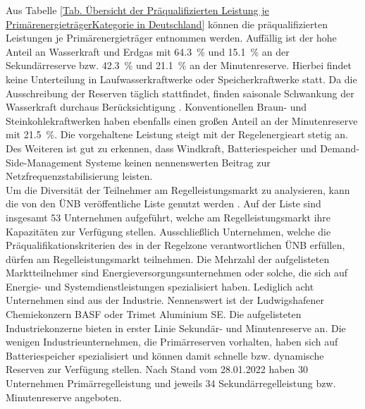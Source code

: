 			Aus Tabelle \ref{Tab. Übersicht der Präqualifizierten Leistung je PrimärenergieträgerKategorie in Deutschland} können die präqualifizierten Leistungen je Primärenergieträger entnommen werden.
			Auffällig ist der hohe Anteil an Wasserkraft und Erdgas mit \SI{64,3}{\percent} und \SI{15,1}{\percent} an der Sekundärreserve bzw. \SI{42,3}{\percent} und \SI{21,1}{\percent} an der Minutenreserve.
			Hierbei findet keine Unterteilung in Laufwasserkraftwerke oder Speicherkraftwerke statt.
			Da die Ausschreibung der Reserven täglich stattfindet, finden saisonale Schwankung der Wasserkraft durchaus Berücksichtigung \cite{Doktorarbeit_Reitsam}.
			Konventionellen Braun- und Steinkohlekraftwerken haben ebenfalls einen großen Anteil an der Minutenreserve mit \SI{21,5}{\percent}.
			Die vorgehaltene Leistung steigt mit der Regelenergieart stetig an.
			Des Weiteren ist gut zu erkennen, dass Windkraft, Batteriespeicher und Demand-Side-Management Systeme keinen nennenswerten Beitrag zur Netzfrequenzstabilisierung leisten. \\
			
			Um die Diversität der Teilnehmer am Regelleistungsmarkt zu analysieren, kann die von den ÜNB veröffentliche Liste genutzt werden \cite{regelleistungnet_PRL_Ausschreibung}.
			Auf der Liste sind insgesamt \num{53} Unternehmen aufgeführt, welche am Regelleistungsmarkt ihre Kapazitäten zur Verfügung stellen.
			Ausschließlich Unternehmen, welche die Präqualifikationskriterien des in der Regelzone verantwortlichen ÜNB erfüllen, dürfen am Regelleistungsmarkt teilnehmen.
			Die Mehrzahl der aufgelisteten Marktteilnehmer sind Energieversorgungsunternehmen oder solche, die sich auf Energie- und Systemdienstleistungen spezialisiert haben.
			Lediglich acht Unternehmen sind aus der Industrie.
			Nennenswert ist der Ludwigshafener Chemiekonzern BASF oder Trimet Aluminium SE.
			Die aufgelisteten Industriekonzerne bieten in erster Linie Sekundär- und Minutenreserve an.
			Die wenigen Industrieunternehmen, die Primärreserven vorhalten, haben sich auf Batteriespeicher spezialisiert und können damit schnelle bzw. dynamische Reserven zur Verfügung stellen.
			Nach Stand vom 28.01.2022 haben 30 Unternehmen Primärregelleistung und jeweils 34 Sekundärregelleistung bzw. Minutenreserve angeboten. 
						
